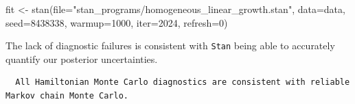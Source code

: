 \documentclass[
  letterpaper,
  DIV=11,
  numbers=noendperiod]{scrartcl}
\newenvironment{Shaded}{\begin{snugshade}}{\end{snugshade}}
\newcommand{\AttributeTok}[1]{\textcolor[rgb]{0.40,0.45,0.13}{#1}}
\newcommand{\ConstantTok}[1]{\textcolor[rgb]{0.56,0.35,0.01}{#1}}
\newcommand{\DecValTok}[1]{\textcolor[rgb]{0.68,0.00,0.00}{#1}}
\newcommand{\FunctionTok}[1]{\textcolor[rgb]{0.28,0.35,0.67}{#1}}
\newcommand{\NormalTok}[1]{\textcolor[rgb]{0.00,0.23,0.31}{#1}}
\newcommand{\OtherTok}[1]{\textcolor[rgb]{0.00,0.23,0.31}{#1}}
\newcommand{\SpecialCharTok}[1]{\textcolor[rgb]{0.37,0.37,0.37}{#1}}
\newcommand{\StringTok}[1]{\textcolor[rgb]{0.13,0.47,0.30}{#1}}
\begin{document}
\begin{Shaded}
\begin{Highlighting}[]
\NormalTok{fit }\OtherTok{\textless{}{-}} \FunctionTok{stan}\NormalTok{(}\AttributeTok{file=}\StringTok{"stan\_programs/homogeneous\_linear\_growth.stan"}\NormalTok{,}
            \AttributeTok{data=}\NormalTok{data, }\AttributeTok{seed=}\DecValTok{8438338}\NormalTok{,}
            \AttributeTok{warmup=}\DecValTok{1000}\NormalTok{, }\AttributeTok{iter=}\DecValTok{2024}\NormalTok{, }\AttributeTok{refresh=}\DecValTok{0}\NormalTok{)}
\end{Highlighting}
\end{Shaded}

The lack of diagnostic failures is consistent with \texttt{Stan} being
able to accurately quantify our posterior uncertainties.

\begin{Shaded}
\end{Shaded}

\begin{verbatim}
  All Hamiltonian Monte Carlo diagnostics are consistent with reliable
Markov chain Monte Carlo.
\end{verbatim}

\begin{Shaded}
\end{Shaded}
\end{document}
